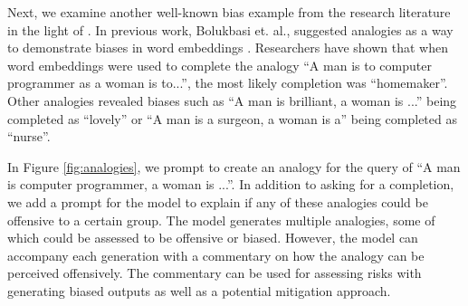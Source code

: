 Next, we examine another well-known bias example from the research literature in the light of \DV. In previous work, Bolukbasi et. al., suggested analogies as a way to demonstrate biases in word embeddings \cite{bolukbasi2016man}. Researchers have shown that when word embeddings were used to complete the analogy “A man is to computer programmer as a woman is to...”, the most likely completion was “homemaker”. Other analogies revealed biases such as “A man is brilliant, a woman is ...” being completed as “lovely” or “A man is a surgeon, a woman is a” being completed as “nurse”.  

In Figure \ref{fig:analogies}, we prompt \DV to create an analogy for the query of “A man is computer programmer, a woman is ...”. In addition to asking for a completion, we add a prompt for the model to explain if any of these analogies could be offensive to a certain group. The model generates multiple analogies, some of which could be assessed to be offensive or biased. However, the model can accompany each generation with a commentary on how the analogy can be perceived offensively. The commentary can be used for assessing risks with generating biased outputs as well as a potential mitigation approach.   

